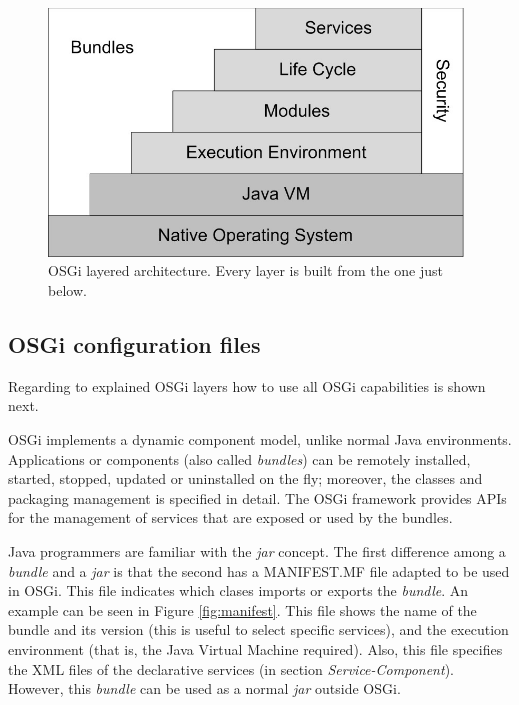 \begin{figure}
\centering
\includegraphics[width=26pc]{gfx/soa/osgi-oficial.jpg}
\caption{OSGi layered architecture. Every layer is built from the one just below.}
\label{fig:osgi-original}
\end{figure}






\subsection{OSGi configuration files}
Regarding to explained OSGi layers how to use all OSGi capabilities is shown next. 

OSGi implements a dynamic component model, unlike normal Java
environments. Applications or components (also called
\emph{bundles}) can be remotely installed, started, stopped, updated
or uninstalled on the fly; moreover, the classes and
packaging management is specified in detail. The OSGi framework provides
APIs for the management of services that are exposed or used by the
bundles.

Java programmers are familiar with the {\em jar} concept. The first difference among a {\em bundle} and a {\em jar} is that the second has a MANIFEST.MF file adapted to be used in OSGi. This file indicates which clases imports or exports the {\em bundle}. An example can be seen in Figure \ref{fig:manifest}. This file shows the name of the bundle and its version (this is useful to select specific services), and the execution environment (that is, the Java Virtual Machine required). Also, this file specifies the XML files of the declarative services (in section {\em Service-Component}). However, this {\em bundle} can be used as a normal {\em jar} outside OSGi.

